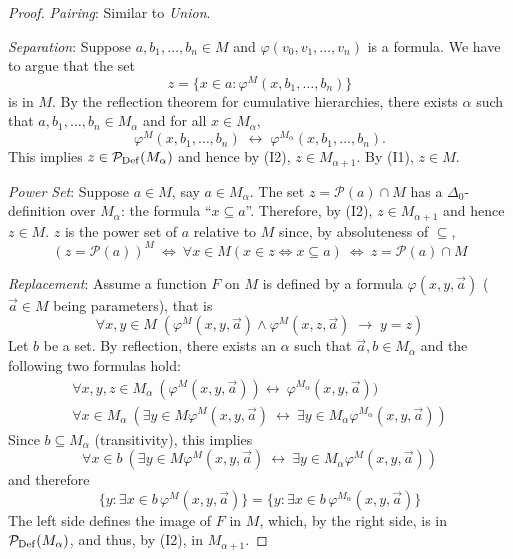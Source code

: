 \begin{proof}
\textit{Pairing}: Similar to \textit{Union}.

\textit{Separation}: Suppose $a, b_1, \dots, b_n \in M$ and $\varphi(v_0, v_1, \dots, v_n)$ is a formula. We have to argue that the set
\begin{equation*}
z = \{ x \in a \colon \varphi^M(x, b_1, \dots, b_n) \}
\end{equation*}
is in $M$. By the reflection theorem for cumulative hierarchies, there exists $\alpha$ such that $a, b_1, \dots, b_n \in M_\alpha$ and for all $x \in M_\alpha$,
\begin{equation*}
\varphi^M(x, b_1, \dots, b_n) \; \leftrightarrow \; \varphi^{M_\alpha}(x, b_1, \dots, b_n).
\end{equation*}
This implies $z \in \mathcal{P}_{\operatorname{Def}}(M_\alpha)$ and hence by (I2), $z \in M_{\alpha+1}$. By (I1), $z \in M$.

\textit{Power Set}: Suppose $a \in M$, say $a \in M_\alpha$. The set $z = \mathcal{P}(a)\cap M$ has a $\Delta_0$-definition over $M_\alpha$: the formula ``$x \subseteq a$''. Therefore, by (I2), $z \in M_{\alpha+1}$ and hence $z \in M$. $z$ is the power set of $a$ relative to $M$ since, by absoluteness of $\subseteq$,
\begin{equation*}
(z = \mathcal{P}(a))^M \: \iff \: \forall x \in M (x \in z \iff x \subseteq a) \: \iff \: z = \mathcal{P}(a) \cap M
\end{equation*}

\textit{Replacement}: Assume a function $F$ on $M$ is defined by a formula $\varphi(x,y,\vec{a})$ ($\vec{a} \in M$ being parameters), that is
\begin{equation*}
\forall x,y \in M \; (\varphi^M(x,y,\vec{a}) \wedge \varphi^M(x,z,\vec{a}) \; \to \; y=z )
\end{equation*}
Let $b$ be a set. By reflection, there exists an $\alpha$ such that $\vec{a}, b \in M_\alpha$ and the following two formulas hold:
\begin{gather*}
	\forall x,y, z \in M_\alpha \: (\varphi^M(x,y,\vec{a})) \leftrightarrow \: \varphi^{M_\alpha}(x,y,\vec{a})) \\
	\forall x \in M_\alpha \: (\exists y\in M \varphi^M(x,y,\vec{a}) \: \leftrightarrow \: \exists y \in M_\alpha \varphi^{M_\alpha}(x,y,\vec{a}))
\end{gather*}
Since $b \subseteq M_{\alpha}$ (transitivity), this implies
\begin{equation*}
\forall x \in b \: (\exists y\in M \varphi^M(x,y,\vec{a}) \: \leftrightarrow \: \exists y \in M_\alpha \varphi^M(x,y,\vec{a}))
\end{equation*}
and therefore
\begin{equation*}
\{ y : \exists x \in b \, \varphi^{M}(x,y,\vec{a}) \} = \{ y : \exists x \in b \, \varphi^{M_\alpha}(x,y,\vec{a}) \}
\end{equation*}
The left side defines the image of $F$ in $M$, which, by the right side, is in $\mathcal{P}_{\operatorname{Def}}(M_\alpha)$, and thus, by (I2), in $M_{\alpha+1}$.


\end{proof}
